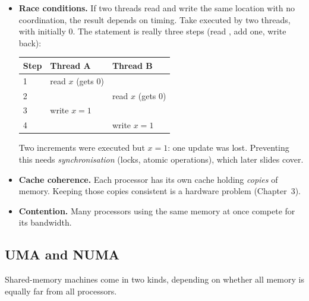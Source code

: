 \begin{itemize}
  \item \textbf{Race conditions.} If two threads read and write the same location with no coordination, the result depends on
        timing. Take  executed by two threads, with  initially $0$. The statement is really three steps
        (read , add one, write back):

  \begin{center}
  \begin{tabular}{@{}lll@{}}
  \toprule
  Step & Thread A & Thread B\\
  \midrule
  1 & read $x$ (gets $0$) & \\
  2 &  & read $x$ (gets $0$)\\
  3 & write $x=1$ & \\
  4 &  & write $x=1$\\
  \bottomrule
  \end{tabular}
  \end{center}
  Two increments were executed but $x=1$: one update was lost. Preventing this needs \emph{synchronisation}
  (locks, atomic operations), which later slides cover.
  \item \textbf{Cache coherence.} Each processor has its own cache holding \emph{copies} of memory.
        Keeping those copies consistent is a hardware problem (Chapter~3).
  \item \textbf{Contention.} Many processors using the same memory at once compete for its bandwidth.
\end{itemize}

\subsection{UMA and NUMA}

Shared-memory machines come in two kinds, depending on whether all memory is equally far from all processors.

\begin{center}
\end{center}

